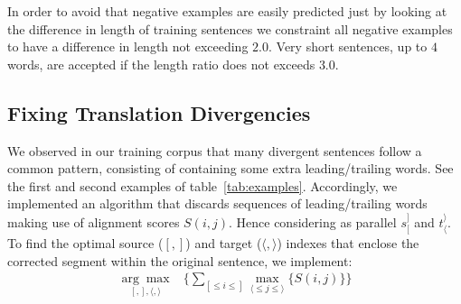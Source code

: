 \documentclass[11pt,a4paper]{article}
\begin{document}
In order to avoid that negative examples are easily predicted just by looking at the difference in length of training sentences we constraint all negative examples to have a difference in length not exceeding $2.0$. Very short sentences, up to $4$ words, are accepted if the length ratio does not exceeds $3.0$.


\subsection{Fixing Translation Divergencies}
\label{correction}

We observed in our training corpus that many divergent sentences follow a common pattern, consisting of containing some extra leading/trailing words. See the first and second examples of table~\ref{tab:examples}. 
Accordingly, we implemented an algorithm that discards sequences of leading/trailing words making use of alignment scores $S(i,j)$. 
Hence considering as parallel $s_[^]$ and $t_\langle^\rangle$. To find the optimal source ($[, ]$) and target ($\langle, \rangle$) indexes that enclose the corrected segment within the original sentence, we implement:
\begin{equation*}
\begin{split}
\underset{[, ], \langle, \rangle}{\arg\max}& \Big \{      \underset{[ \le i \le ]}{\sum} \underset{\langle \le j \le \rangle}{\max} \{ S(i,j) \}  \Big \} %
\end{split}
\end{equation*}
\end{document}
